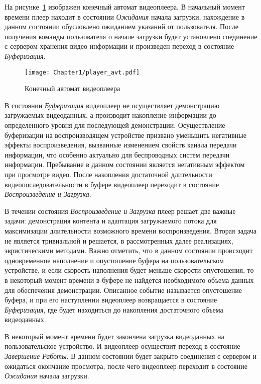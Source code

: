 На рисунке~\ref{fig:Player_avt} изображен конечный автомат видеоплеера. В начальный момент времени плеер находит в состоянии \textit{Ожидания} начала загрузки, нахождение в данном состоянии обусловлено ожиданием указаний от пользователя. После получения команды пользователя о начале загрузки будет установлено соединение с сервером хранения видео информации и произведен переход в состояние \textit{Буферизация}.

\begin{figure}[htbp]
\begin{center}
\texttt{[image: Chapter1/player\_avt.pdf]}
\caption{Конечный автомат видеоплеера}
\label{fig:Player_avt}
\end{center}
\end{figure}

В состоянии \textit{Буферизация} видеоплеер не осуществляет демонстрацию загружаемых видеоданных, а производит накопление информации до определенного уровня для последующей демонстрации. Осуществление буферизации на воспроизводящем устройстве призвано уменьшить негативные эффекты воспроизведения, вызванные изменением свойств канала передачи информации, что особенно актуально для беспроводных систем передачи информации. Пребывание в данном состоянии является негативным эффектом при просмотре видео. После накопления достаточной длительности видеопоследовательности в буфере видеоплеер переходит в состояние \textit{Воспроизведение и Загрузка}.

В течении состояния \textit{Воспроизведение и Загрузка} плеер решает две важные задачи: демонстрация контента и адаптация загружаемого потока для максимизации длительности возможного времени воспроизведения. Вторая задача не является тривиальной и решается, в рассмотренных далее реализациях, эвристическими методами. Важно отметить, что в данном состоянии происходит одновременное наполнение и опустошение буфера на пользовательском устройстве, и если скорость наполнения будет меньше скорости опустошения, то в некоторый момент времени в буфере не найдется необходимого объема данных для обеспечения демонстрации. Описанное событие называется опустошение буфера, и при его наступлении видеоплеер возвращается в состояние \textit{Буферизация}, где будет находиться до накопления достаточного объема видеоданных.

В некоторый момент времени будет закончена загрузка видеоданных на пользовательское устройство. И видеоплеер осуществит переход в состояние \textit{Завершение Работы}. В данном состоянии будет закрыто соединения с сервером и ожидаться окончание просмотра, после чего видеоплеер переходит в состояние \textit{Ожидания} начала загрузки.

